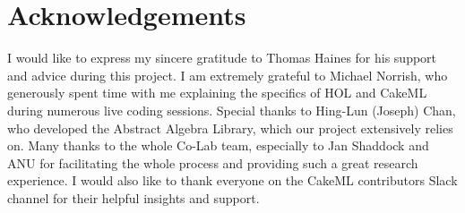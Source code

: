 \chapter*{Acknowledgements}
I would like to express my sincere gratitude to Thomas Haines for his support and advice during this project. I am extremely grateful to Michael Norrish, who generously spent time with me explaining the specifics of HOL and CakeML during numerous live coding sessions. Special thanks to Hing-Lun (Joseph) Chan, who developed the Abstract Algebra Library, which our project extensively relies on. Many thanks to the whole Co-Lab team, especially to Jan Shaddock and ANU for facilitating the whole process and providing such a great research experience. I would also like to thank everyone on the CakeML contributors Slack channel for their helpful insights and support.

